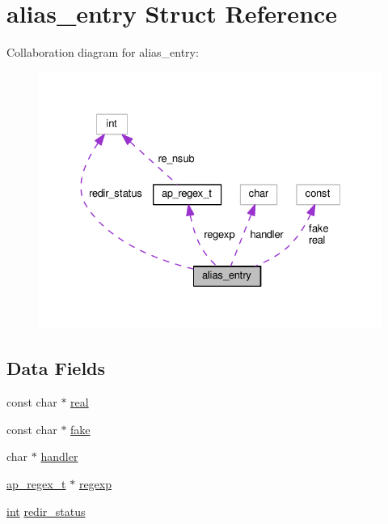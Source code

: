 \hypertarget{structalias__entry}{}\section{alias\+\_\+entry Struct Reference}
\label{structalias__entry}


Collaboration diagram for alias\+\_\+entry\+:
\nopagebreak
\begin{figure}[H]
\begin{center}
\leavevmode
\includegraphics[width=327pt]{structalias__entry__coll__graph}
\end{center}
\end{figure}
\subsection*{Data Fields}
\begin{DoxyCompactItemize}
\item 
const char $\ast$ \hyperlink{structalias__entry_a73e7d20af61e3e8041d0d04a16d8dfc8}{real}
\item 
const char $\ast$ \hyperlink{structalias__entry_ad9df3319f69e08346dc3dc578b640e5c}{fake}
\item 
char $\ast$ \hyperlink{structalias__entry_aa860e23eb680b00acbc455eb68b0293c}{handler}
\item 
\hyperlink{structap__regex__t}{ap\+\_\+regex\+\_\+t} $\ast$ \hyperlink{structalias__entry_a5b080d2abe5dc70fc7c652981fd491b8}{regexp}
\item 
\hyperlink{pcre_8txt_a42dfa4ff673c82d8efe7144098fbc198}{int} \hyperlink{structalias__entry_a4c12c488d4159b7221d7e9cfbc1d4f0e}{redir\+\_\+status}
\end{DoxyCompactItemize}


